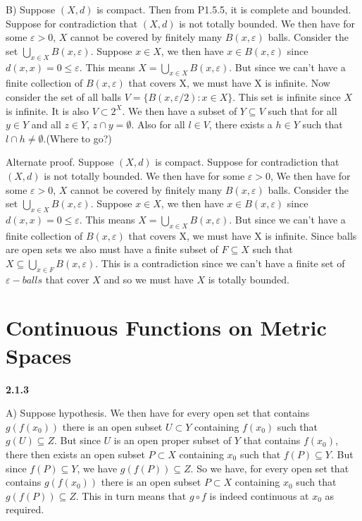 \documentclass[12pt]{article}
\begin{document}
B) Suppose $(X,d)$ is compact. Then from P1.5.5, it is complete and bounded. Suppose for contradiction that $(X,d)$ is not totally bounded. We then have for some $\varepsilon>0$, $X$ cannot be covered by finitely many $B(x,\varepsilon)$ balls. Consider the set $\bigcup _{x\in X}B(x,\varepsilon)$. Suppose $x\in X$, we then have $x\in B(x,\varepsilon)$ since $d(x,x) = 0\leq \varepsilon$. This means $X=\bigcup _{x\in X}B(x,\varepsilon)$. But since we can't have a finite collection of $B(x,\varepsilon)$ that covers X, we must have X is infinite. Now consider the set of all balls $V=\{B(x,\varepsilon/2): x\in X\}$. This set is infinite since $X$ is infinite. It is also $V \subset 2^X$. We then have a subset of $Y\subseteq V$ such that for all $y\in Y$ and all $z\in Y$, $z\cap y = \emptyset$. Also for all $l\in V$, there exists a $h\in Y$ such that $l\cap h \neq \emptyset$.(Where to go?)

Alternate proof. Suppose $(X,d)$ is compact. Suppose for contradiction that $(X,d)$ is not totally bounded. We then have for some $\varepsilon>0$, We then have for some $\varepsilon>0$, $X$ cannot be covered by finitely many $B(x,\varepsilon)$ balls. Consider the set $\bigcup _{x\in X}B(x,\varepsilon)$. Suppose $x\in X$, we then have $x\in B(x,\varepsilon)$ since $d(x,x) = 0\leq \varepsilon$. This means $X=\bigcup _{x\in X}B(x,\varepsilon)$. But since we can't have a finite collection of $B(x,\varepsilon)$ that covers X, we must have X is infinite. Since balls are open sets we also must have a finite subset of $F\subseteq X$ such that $X\subseteq \bigcup _{x\in F}B(x,\varepsilon)$. This is a contradiction since we can't have a finite set of $\varepsilon-balls$ that cover $X$ and so we must have $X$ is totally bounded. 

\section{Continuous Functions on Metric Spaces}

\textbf{2.1.3}

A) Suppose hypothesis. We then have for every open set that contains $g(f(x_0))$ there is an open subset $U\subset Y$ containing $f(x_0)$ such that $g(U)\subseteq Z$. But since $U$ is an open proper subset of $Y$ that contains $f(x_0)$, there then exists an open subset $P \subset X$ containing $x_0$ such that $f(P)\subseteq Y$. But since $f(P) \subseteq Y$, we have $g(f(P)) \subseteq Z$. So we have, for every open set that contains $g(f(x_0))$ there is an open subset $P \subset X$ containing $x_0$ such that $g(f(P)) \subseteq Z$. This in turn means that $g\circ f$ is indeed continuous at $x_0$ as required. 
\end{document}
